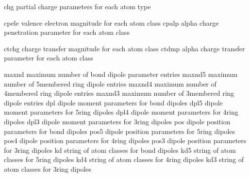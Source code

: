 \documentclass[letterpaper,11pt,english]{sphinxmanual}
\begin{document}
\sphinxAtStartPar
{}

\begin{sphinxVerbatim}[commandchars=\\\{\}]
chg             partial charge parameters for each atom type
\end{sphinxVerbatim}

\sphinxAtStartPar
{}

\begin{sphinxVerbatim}[commandchars=\\\{\}]
cpele           valence electron magnitude for each atom class
cpalp           alpha charge penetration parameter for each atom class
\end{sphinxVerbatim}

\sphinxAtStartPar
{}

\begin{sphinxVerbatim}[commandchars=\\\{\}]
ctchg           charge transfer magnitude for each atom class
ctdmp           alpha charge transfer parameter for each atom class
\end{sphinxVerbatim}

\sphinxAtStartPar
{}

\begin{sphinxVerbatim}[commandchars=\\\{\}]
maxnd           maximum number of bond dipole parameter entries
maxnd5          maximum number of 5\PYGZhy{}membered ring dipole entries
maxnd4          maximum number of 4\PYGZhy{}membered ring dipole entries
maxnd3          maximum number of 3\PYGZhy{}membered ring dipole entries
dpl             dipole moment parameters for bond dipoles
dpl5            dipole moment parameters for 5\PYGZhy{}ring dipoles
dpl4            dipole moment parameters for 4\PYGZhy{}ring dipoles
dpl3            dipole moment parameters for 3\PYGZhy{}ring dipoles
pos             dipole position parameters for bond dipoles
pos5            dipole position parameters for 5\PYGZhy{}ring dipoles
pos4            dipole position parameters for 4\PYGZhy{}ring dipoles
pos3            dipole position parameters for 3\PYGZhy{}ring dipoles
kd              string of atom classes for bond dipoles
kd5             string of atom classes for 5\PYGZhy{}ring dipoles
kd4             string of atom classes for 4\PYGZhy{}ring dipoles
kd3             string of atom classes for 3\PYGZhy{}ring dipoles
\end{sphinxVerbatim}
\end{document}
